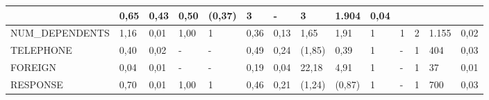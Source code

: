 \begin{table}[]
\begin{tabular}{|p{2.6cm}|p{0.75cm}|p{0.6cm}|p{0.75cm}|p{0.6cm}|p{0.75cm}|p{1.2cm}|p{0.6cm}|p{0.65cm}|p{0.7cm}|p{0.45cm}|p{0.65cm}|p{0.85cm}|p{0.55cm}|}
		&{\tiny 0,65}&{\tiny 0,43}&{\tiny 0,50}&{\tiny (0,37)}
		&{\tiny 3}&{\tiny -}&{\tiny 3}&{\tiny  1.904}&{\tiny 0,04}\\ \hline
		{\tiny NUM\_DEPENDENTS}
		&{\tiny 1,16}&{\tiny 0,01}&{\tiny 1,00}&{\tiny 1}
		&{\tiny 0,36}&{\tiny 0,13}&{\tiny 1,65}&{\tiny 1,91}
		&{\tiny 1}&{\tiny 1}&{\tiny 2}&{\tiny 1.155}&{\tiny 0,02}\\ \hline
		{\tiny TELEPHONE}
		&{\tiny 0,40}&{\tiny 0,02}&{\tiny -}&{\tiny -}
		&{\tiny 0,49}&{\tiny 0,24}&{\tiny (1,85)}&{\tiny 0,39}
		&{\tiny 1}&{\tiny -}&{\tiny 1}&{\tiny 404}&{\tiny 0,03}\\ \hline
		{\tiny FOREIGN }
		&{\tiny 0,04}&{\tiny 0,01}&{\tiny -}&{\tiny -}
		&{\tiny 0,19}&{\tiny 0,04}&{\tiny 22,18}&{\tiny 4,91}
		&{\tiny 1}&{\tiny -}&{\tiny 1}&{\tiny 37}&{\tiny 0,01 }\\ \hline
		{\tiny RESPONSE}
		&{\tiny 0,70}&{\tiny 0,01}&{\tiny 1,00}&{\tiny 1}
		&{\tiny 0,46}&{\tiny 0,21}&{\tiny (1,24)}&{\tiny (0,87)}
		&{\tiny 1}&{\tiny -}&{\tiny 1}&{\tiny 700}&{\tiny 0,03}\\ \hline            
	\end{tabular}
\end{table}